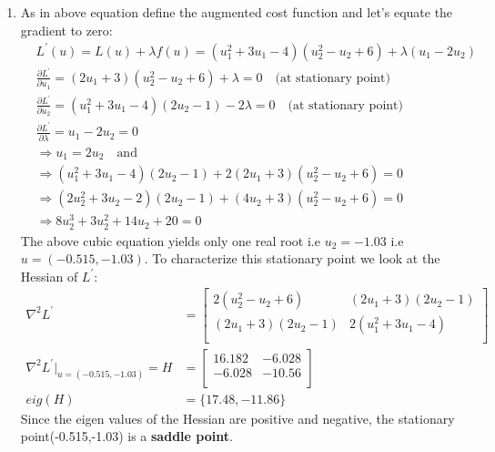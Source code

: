 \begin{enumerate}
\begin{enumerate}
   \item %
    As in above equation define the augmented cost function and let's equate the
gradient to zero:
    \begin{align*}
     &L^\prime(u) = L(u) + \lambda f(u) = (u_1^2 + 3 u_1 - 4) (u_2^2 - u_2 + 6)
+ \lambda (u_1 - 2 u_2) \\
     &\frac{\partial L^\prime}{\partial u_1} = (2 u_1 + 3)(u_2^2 - u_2 + 6) +
\lambda = 0 \quad \text{(at stationary point)} \\
     &\frac{\partial L^\prime}{\partial u_2} = (u_1^2 + 3 u_1 - 4)(2 u_2 - 1) -
2 \lambda = 0 \quad \text{(at stationary point)} \\
     &\frac{\partial L^\prime}{\partial \lambda} = u_1 - 2u_2 = 0 \\
     &\Rightarrow u_1 = 2u_2 \quad \text{and}\\
     &\Rightarrow (u_1^2 + 3 u_1 - 4)(2 u_2 - 1) + 2 (2 u_1 + 3)(u_2^2 - u_2 +
6) = 0\\
     &\Rightarrow (2 u_2^2 + 3 u_2 -2)(2 u_2 -1) +  (4 u_2 + 3)(u_2^2 - u_2 + 6)
= 0\\
     &\Rightarrow 8 u_2^3 + 3 u_2^2 +14 u_2 + 20 = 0
    \end{align*}
    The above cubic equation yields only one real root i.e $u_2 = -1.03$ i.e $u
= (-0.515,-1.03)$. To characterize this stationary point we look at the Hessian
of $L^\prime$:
    \begin{align*}
     \nabla^2 L^\prime &= \begin{bmatrix}
			    2(u_2^2 - u_2 + 6) & (2u_1 + 3) (2 u_2 - 1) \\
			    (2 u_1 + 3) (2 u_2 -1) & 2(u_1^2 + 3 u_1 - 4) \\
                         \end{bmatrix}\\
     \nabla^2 L^\prime |_{u=(-0.515,-1.03)} = H &= \begin{bmatrix}
                                              16.182 & -6.028 \\
                                              -6.028 & -10.56 \\
                                             \end{bmatrix} \quad \\
     eig(H) &= \{17.48,-11.86\}                                            
    \end{align*}
    Since the eigen values of the Hessian are positive and negative, the
stationary point(-0.515,-1.03) is a \textbf{saddle point}.
  \end{enumerate}
  

\end{enumerate}
